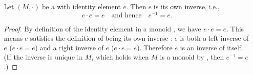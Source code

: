 \begin{lemma} \label{lemma:identity_element_is_its_own_inverse_in_a_monoid}
    Let $(M,\cdot)$ be a  with identity element $e$. Then $e$ is its own inverse, i.e.,
    $$e \cdot e = e \quad\text{and hence}\quad e^{-1} = e.$$
\end{lemma}
\begin{proof}
    By definition of the identity element in a monoid , we have $e \cdot e = e$. This means $e$ satisfies the definition of being its own inverse : $e$ is both a left inverse of $e$ ($e \cdot e = e$) and a right inverse of $e$ ($e \cdot e = e$). Therefore $e$ is an inverse of itself. (If the inverse is unique in $M$, which holds when $M$ is a monoid by , then $e^{-1} = e$.)
\end{proof}